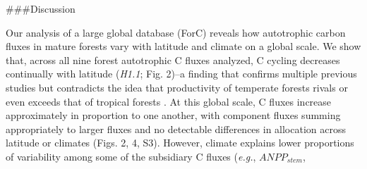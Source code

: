 \documentclass[
]{article}
\begin{document}
\#\#\#Discussion

Our analysis of a large global database (ForC) reveals how autotrophic
carbon fluxes in mature forests vary with latitude and climate on a
global scale. We show that, across all nine forest autotrophic C fluxes
analyzed, C cycling decreases continually with latitude (\emph{H1.1};
Fig. 2)--a finding that confirms multiple previous studies but
contradicts the idea that productivity of temperate forests rivals or
even exceeds that of tropical forests
\citep{luyssaert_co_2007, huston_global_2009}. At this global scale, C
fluxes increase approximately in proportion to one another, with
component fluxes summing appropriately to larger fluxes and no
detectable differences in allocation across latitude or climates (Figs.
2, 4, S3). However, climate explains lower proportions of variability
among some of the subsidiary C fluxes (\emph{e.g.}, \(ANPP_{stem}\),
\end{document}
